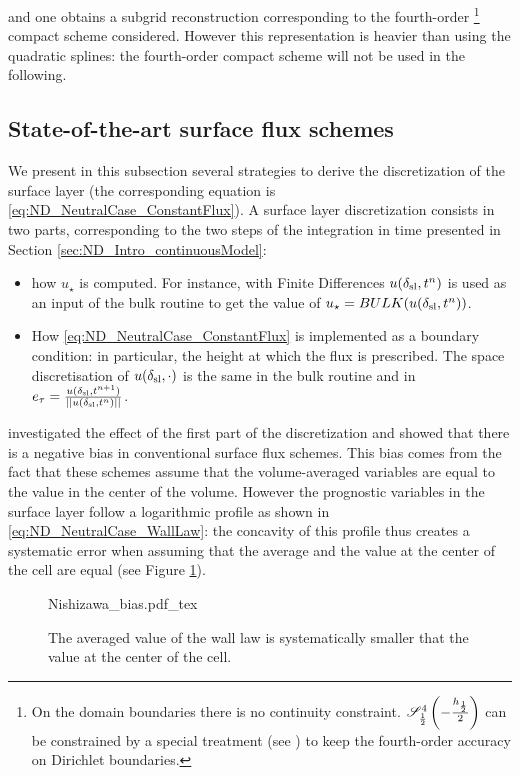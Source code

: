 and one obtains a subgrid reconstruction corresponding to
the fourth-order
\footnote{
On the domain boundaries there is no continuity constraint.
${\cal S}^4_{\frac{1}{2}}\left(-\frac{h_{\frac{1}{2}}}{2}\right)$
can be constrained by a special treatment
(see \cite{piller_finite-volume_2004})
to keep the fourth-order accuracy on Dirichlet boundaries.
}
compact scheme considered.
However this representation is heavier than using the quadratic
splines: the fourth-order compact scheme will not be used in the
following.
\subsection{State-of-the-art surface flux schemes}
\label{sec:ND_NeutralCase_strategies}
We present in this subsection several strategies to derive the
discretization of the surface layer (the corresponding equation
is \eqref{eq:ND_NeutralCase_ConstantFlux}).
A surface layer discretization consists in two parts,
corresponding to the two steps of the integration in time
presented in Section \ref{sec:ND_Intro_continuousModel}:
\begin{itemize}
	\item how $u_\star$ is computed.
		For instance, with Finite Differences
		$u(\delta_{\rm sl}, t^n)$ is 
		used as an input of the
		bulk routine to get the value of
		$u_\star = BULK(u(\delta_{\rm sl}, t^n))$.
	\item How \eqref{eq:ND_NeutralCase_ConstantFlux}
		is implemented as
		a boundary condition: in particular,
		the height at which the flux is prescribed.
		The space discretisation of
		$u(\delta_{\rm sl}, \cdot)$ is the same
		in the bulk routine and in
		$e_\tau= \frac{u(\delta_{\rm sl},
		t^{n+1})}
		{||u(\delta_{\rm sl}, t^n)||}$.
\end{itemize}
\cite{nishizawa_surface_2018} investigated the effect of the
first part of the discretization and showed that there is a
negative bias in conventional surface flux schemes. This
bias comes from the fact that these schemes assume that the
volume-averaged variables are equal to the value in the center
of the volume. However the prognostic variables in the surface layer
follow a logarithmic profile as shown in
\eqref{eq:ND_NeutralCase_WallLaw}: the concavity of this profile thus
creates a systematic error when assuming that the average and the
value at the center of the cell are equal
(see Figure \ref{fig:ND_NeutralCase_nishizawaBias}).
\begin{figure}
	\centering
	{Nishizawa_bias.pdf_tex}
	\caption{The averaged value of the wall law is
		systematically smaller that the value at
		the center of the cell.}
	\label{fig:ND_NeutralCase_nishizawaBias}
\end{figure}
